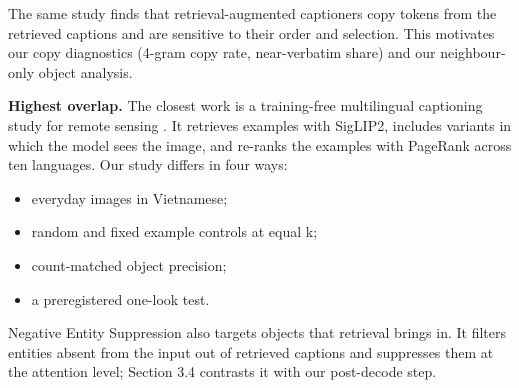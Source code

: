 \documentclass[manuscript,screen]{acmart}
\providecommand{\tightlist}{\setlength{\itemsep}{0pt}\setlength{\parskip}{0pt}}
\begin{document}
The same study \citep{Li2024RetrievalRobustness} finds that retrieval-augmented captioners copy
tokens from the retrieved captions and are sensitive to their order and selection. This motivates
our copy diagnostics (4-gram copy rate, near-verbatim share) and our neighbour-only object analysis.

\textbf{Highest overlap.} The closest work is a training-free multilingual captioning study for
remote sensing \citep{Rebelo2025RSCap}. It retrieves examples with SigLIP2, includes variants in
which the model sees the image, and re-ranks the examples with PageRank across ten languages. Our
study differs in four ways:

\begin{itemize}
\tightlist
\item
  everyday images in Vietnamese;
\item
  random and fixed example controls at equal k;
\item
  count-matched object precision;
\item
  a preregistered one-look test.
\end{itemize}

Negative Entity Suppression \citep{Lu2025NES} also targets objects that retrieval brings in. It
filters entities absent from the input out of retrieved captions and suppresses them at the
attention level; Section 3.4 contrasts it with our post-decode step.
\end{document}

